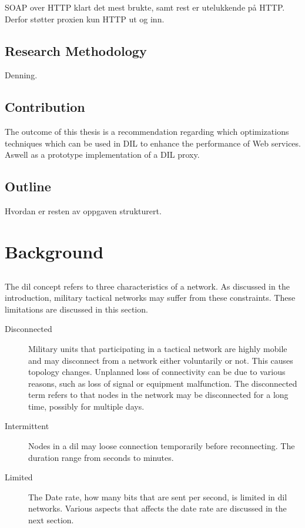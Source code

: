 \documentclass[USenglish]{ifimaster}
\begin{document}
SOAP over HTTP klart det mest brukte, samt rest er utelukkende på HTTP. Derfor
støtter proxien kun HTTP ut og inn.

\section{Research Methodology}
Denning.


\section{Contribution}

The outcome of this thesis is a recommendation regarding which optimizations
techniques which can be used in DIL to enhance the performance of Web services.
Aswell as a prototype implementation of a DIL proxy.

\section{Outline}
Hvordan er resten av oppgaven strukturert.


\chapter{Background}

\section{}
\label{dil}
The \gls{dil} concept refers to three characteristics of a network. As discussed
in the introduction, military tactical networks may suffer from these
constraints. These limitations are discussed in this section.

\begin{description}
\item[Disconnected]
Military units that participating in a tactical network are highly mobile
and may disconnect from a network either voluntarily or not. This causes
topology changes. Unplanned loss of connectivity can be due to various reasons,
such as loss of signal or equipment malfunction.  The disconnected term refers
to that nodes in the network may be disconnected for a long time, possibly for
multiple days.
\item[Intermittent]
Nodes in a \gls{dil} may loose connection temporarily before reconnecting. The
duration range from seconds to minutes.

\item[Limited] The Date rate, how many bits that are sent per second, is limited
in \gls{dil} networks. Various aspects that affects the date rate are discussed
in the next section.

\end{description}
\end{document}
